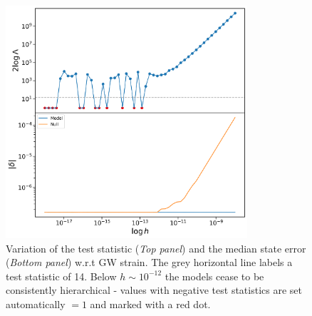 \documentclass{tufte-handout} %
\begin{document}
\begin{figure}
	\includegraphics[width=0.8\textwidth]{images/SNR2}
	\caption{Variation of the test statistic (\textit{Top panel}) and the median state error (\textit{Bottom panel}) w.r.t GW strain. The grey horizontal line labels a test statistic of 14. Below $h \sim 10^{-12}$ the models cease to be consistently hierarchical - values with negative test statistics are set automatically $=1$ and marked with a red dot.}
	\label{fig:SNR}
\end{figure}
\end{document}
